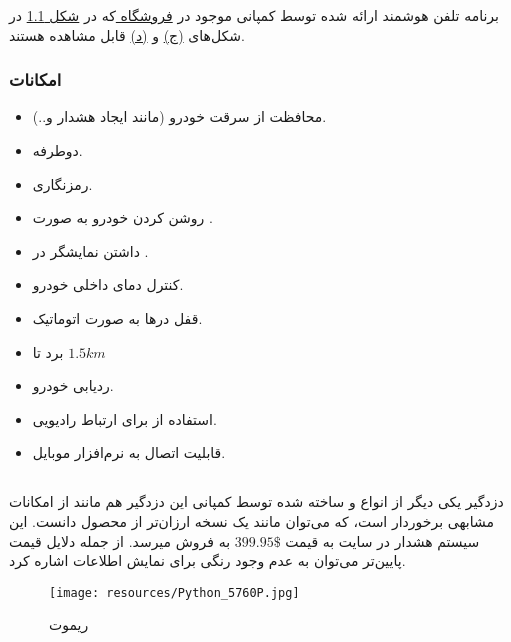\documentclass[a4paper,12pt]{report}
\begin{document}
	برنامه تلفن هوشمند ارائه شده توسط کمپانی
	موجود در
	\hyperref{https://play.google.com/store/apps/details?id=com.directed.android.viper}{car alarm application}{Viper 5906V}{فروشگاه }
	که در
	\hyperref[fig1:sec3:chap1]{شکل 1.1}
	 در شکل‌های
	\hyperref[subfig3:fig1:sec3:chap1]{(ج)}
	و
	\hyperref[subfig3:fig1:sec3:chap1]{(د)}
	قابل مشاهده هستند.

	\subsubsection{
		امکانات
	}\label{subsubsec1:subsec1:sec3:chap1}
	\begin{itemize}[nosep]\label{item1:subsec1:sec3:chap1}
		\item
			محافظت از سرقت خودرو (مانند ایجاد هشدار و..).
		\item
			 دوطرفه.
		\item
			رمزنگاری.
		\item
			روشن کردن خودرو به صورت
			.
		\item
			داشتن نمایشگر
			در
			.
		\item
			کنترل دمای داخلی خودرو.
		\item
			قفل درها به صورت اتوماتیک.
		\item
			برد
				تا
			$1.5 km$
		\item
			ردیابی خودرو.
		\item
			استفاده از
			برای ارتباط رادیویی.
		\item
			قابلیت اتصال به نرم‌افزار موبایل.
	\end{itemize}

	\subsection{
	}\label{subsec2:sec3:chap1}

	دزدگیر
	یکی دیگر از انواع
	و  ساخته شده توسط کمپانی
	این دزدگیر هم مانند
	از امکانات مشابهی برخوردار است، که می‌توان مانند یک نسخه ارزان‌تر از محصول
	دانست. این سیستم هشدار در سایت
		به قیمت
	$399.95\$$
	به فروش میرسد. از جمله دلایل قیمت پایین‌تر می‌توان به عدم وجود
	رنگی برای نمایش اطلاعات اشاره کرد.
	\cite{pythonHo3:online}

	\begin{figure}[!h]
		\begin{center}
			\texttt{[image: resources/Python\_5760P.jpg]}
			\caption{
			ریموت
			}
			\label{fig1:subsec2:sec3:chap1}
		\end{center}
	\end{figure}
\end{document}
